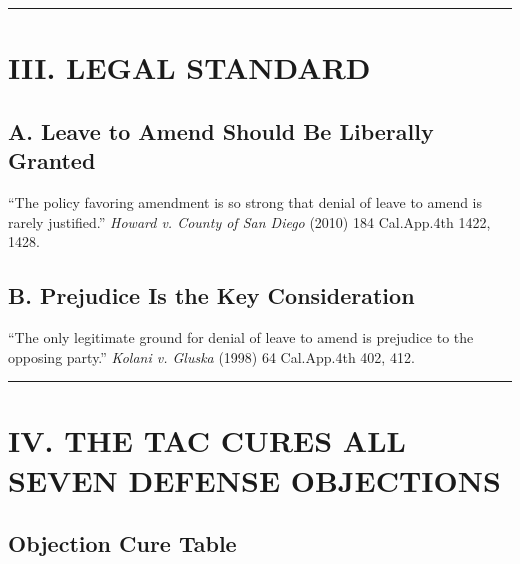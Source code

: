 \begin{center}\rule{0.5\linewidth}{0.5pt}\end{center}

\label{toc:iii-legal-standard}
\section{III. LEGAL STANDARD}\label{iii.-legal-standard}

\subsection{A. Leave to Amend Should Be Liberally Granted}\label{a.-leave-to-amend-should-be-liberally-granted}

``The policy favoring amendment is so strong that denial of leave to amend is rarely justified.'' \emph{Howard v. County of San Diego} (2010) 184 Cal.App.4th 1422, 1428.

\subsection{B. Prejudice Is the Key Consideration}\label{b.-prejudice-is-the-key-consideration}

``The only legitimate ground for denial of leave to amend is prejudice to the opposing party.'' \emph{Kolani v. Gluska} (1998) 64 Cal.App.4th 402, 412.

\begin{center}\rule{0.5\linewidth}{0.5pt}\end{center}

\label{toc:iv-the-tac-cures-all-seven-defense-objections}
\section{IV. THE TAC CURES ALL SEVEN DEFENSE OBJECTIONS}\label{iv.-the-tac-cures-all-seven-defense-objections}

\subsection{Objection {\textrightarrow{}} Cure Table}\label{objection-cure-table}

